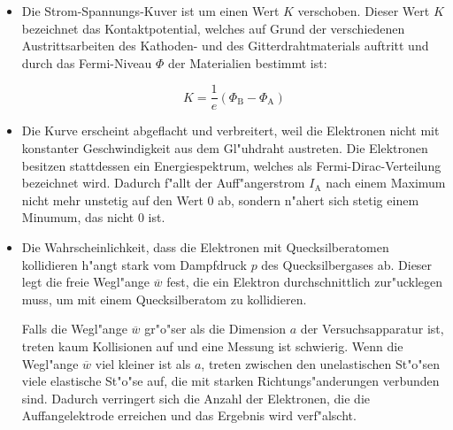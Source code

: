 		\begin{itemize}
			\item Die Strom-Spannungs-Kuver ist um einen Wert $K$ verschoben.
			Dieser Wert $K$ bezeichnet das Kontaktpotential, welches auf Grund der verschiedenen Austrittsarbeiten des Kathoden- und des Gitterdrahtmaterials auftritt und durch das Fermi-Niveau $\Phi$ der Materialien bestimmt ist:

			\begin{equation*}
				K = \frac{1}{e} (\Phi_\mathrm{B} - \Phi_\mathrm{A})
			\end{equation*}

			\item Die Kurve erscheint abgeflacht und verbreitert, weil die Elektronen nicht mit konstanter Geschwindigkeit aus dem Gl"uhdraht austreten.
			Die Elektronen besitzen stattdessen ein Energiespektrum, welches als Fermi-Dirac-Verteilung bezeichnet wird.
			Dadurch f"allt der Auff"angerstrom $I_\mathrm{A}$ nach einem Maximum nicht mehr unstetig auf den Wert 0 ab, sondern n"ahert sich stetig einem Minumum, das nicht 0 ist.

			\item Die Wahrscheinlichkeit, dass die Elektronen mit Quecksilberatomen kollidieren h"angt stark vom Dampfdruck $p$ des Quecksilbergases ab.
			Dieser legt die freie Wegl"ange $\overline{w}$ fest, die ein Elektron durchschnittlich zur"ucklegen muss, um mit einem Quecksilberatom zu kollidieren.

			Falls die Wegl"ange $\overline{w}$ gr"o"ser als die Dimension $a$ der Versuchsapparatur ist, treten kaum Kollisionen auf und eine Messung ist schwierig.
			Wenn die Wegl"ange $\overline{w}$ viel kleiner ist als $a$, treten zwischen den unelastischen St"o"sen viele elastische St"o"se auf, die mit starken Richtungs"anderungen verbunden sind.
			Dadurch verringert sich die Anzahl der Elektronen, die die Auffangelektrode erreichen und das Ergebnis wird verf"alscht.
		\end{itemize}

	\clearpage

